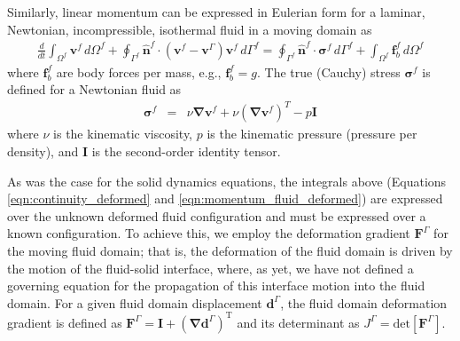 \documentclass[sn-mathphys,Numbered]{sn-jnl}%
\newcommand{\bb}{\boldsymbol}
\begin{document}
Similarly, linear momentum can be expressed in Eulerian form for a laminar, Newtonian, incompressible, isothermal fluid in a moving domain as
\begin{eqnarray} \label{eqn:momentum_fluid_deformed}
	\frac{d}{dt} \int_{\Omega^f} \bb{v}^f \, d\Omega^f
	+ \oint_{\Gamma^f} \hat{\bb{n}}^f \cdot (\bb{v}^f - \bb{v}^\Gamma) \boldsymbol{v}^f \, d\Gamma^f
	=  \oint_{\Gamma^f} \hat{\bb{n}}^f \cdot \bb{\sigma}^f \, d\Gamma^f
	+ \int_{\Omega^f} \bb{f}_b^f \, d\Omega^f
\end{eqnarray}
where $\bb{f}_b^f$ are body forces per mass, e.g., $\bb{f}_b^f = g$.
The true (Cauchy) stress $\bb{\sigma}^f$ is defined for a Newtonian fluid as
\begin{eqnarray} \label{eqn:fluid_stress}
	\bb{\sigma}^f &=& \nu \bb{\nabla} \bb{v}^f + \nu \left(\bb{\nabla} \bb{v}^f \right)^T - p \textbf{I}
\end{eqnarray}
where $\nu$ is the kinematic viscosity, $p$ is the kinematic pressure (pressure per density), and $\textbf{I}$ is the second-order identity tensor.

As was the case for the solid dynamics equations, the integrals above (Equations \ref{eqn:continuity_deformed} and \ref{eqn:momentum_fluid_deformed}) are expressed over the unknown deformed fluid configuration and must be expressed over a known configuration.
To achieve this, we employ the deformation gradient $\bb{F}^{\Gamma}$ for the moving fluid domain; that is, the deformation of the fluid domain is driven by the motion of the fluid-solid interface, where, as yet, we have not defined a governing equation for the propagation of this interface motion into the fluid domain.
For a given fluid domain displacement $\bb{d}^{\Gamma}$, the fluid domain deformation gradient is defined as $\bb{F}^{\Gamma} = \textbf{I} + (\bb{\nabla} \bb{d}^\Gamma)^{\text{T}}$ and its determinant as $J^\Gamma = \text{det}[\bb{F}^\Gamma]$.
\end{document}
